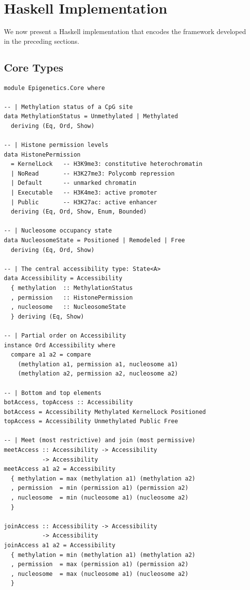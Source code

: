 \documentclass[12pt,a4paper]{article}
\begin{document}
\section{Haskell Implementation}
\label{sec:haskell}

We now present a Haskell implementation that encodes the framework developed in the preceding sections.

\subsection{Core Types}

\begin{lstlisting}[caption={Core epigenetic type definitions}]
module Epigenetics.Core where

-- | Methylation status of a CpG site
data MethylationStatus = Unmethylated | Methylated
  deriving (Eq, Ord, Show)

-- | Histone permission levels
data HistonePermission
  = KernelLock   -- H3K9me3: constitutive heterochromatin
  | NoRead       -- H3K27me3: Polycomb repression
  | Default      -- unmarked chromatin
  | Executable   -- H3K4me3: active promoter
  | Public       -- H3K27ac: active enhancer
  deriving (Eq, Ord, Show, Enum, Bounded)

-- | Nucleosome occupancy state
data NucleosomeState = Positioned | Remodeled | Free
  deriving (Eq, Ord, Show)

-- | The central accessibility type: State<A>
data Accessibility = Accessibility
  { methylation  :: MethylationStatus
  , permission   :: HistonePermission
  , nucleosome   :: NucleosomeState
  } deriving (Eq, Show)

-- | Partial order on Accessibility
instance Ord Accessibility where
  compare a1 a2 = compare
    (methylation a1, permission a1, nucleosome a1)
    (methylation a2, permission a2, nucleosome a2)

-- | Bottom and top elements
botAccess, topAccess :: Accessibility
botAccess = Accessibility Methylated KernelLock Positioned
topAccess = Accessibility Unmethylated Public Free

-- | Meet (most restrictive) and join (most permissive)
meetAccess :: Accessibility -> Accessibility
           -> Accessibility
meetAccess a1 a2 = Accessibility
  { methylation = max (methylation a1) (methylation a2)
  , permission  = min (permission a1) (permission a2)
  , nucleosome  = min (nucleosome a1) (nucleosome a2)
  }

joinAccess :: Accessibility -> Accessibility
           -> Accessibility
joinAccess a1 a2 = Accessibility
  { methylation = min (methylation a1) (methylation a2)
  , permission  = max (permission a1) (permission a2)
  , nucleosome  = max (nucleosome a1) (nucleosome a2)
  }
\end{lstlisting}
\end{document}
